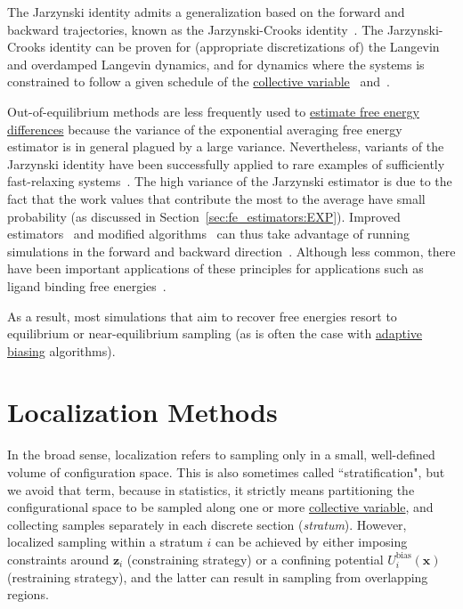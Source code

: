 \documentclass[9pt,review]{livecoms}
\newcommand{\vx}{\mathbf{x}}
\newcommand{\vz}{\mathbf{z}}
\begin{document}
The Jarzynski identity admits a generalization based on the forward and backward trajectories, known as the Jarzynski-Crooks identity~\cite{Crooks99}. The Jarzynski-Crooks identity can be proven for (appropriate discretizations of) the Langevin and overdamped Langevin dynamics, and for dynamics where the systems is constrained to follow a given schedule of the \hyperlink{ref:CV} {collective variable}~\cite{lelievre-rousset-stoltz-07-a,lelievre-rousset-stoltz-12} and~\cite[Chapter 4]{Lelievre2010}.

Out-of-equilibrium methods are less frequently used to \hyperlink{ref:FEestimator} {estimate free energy differences} because the variance of the exponential averaging free energy estimator is in general plagued by a large variance.
Nevertheless, variants of the Jarzynski identity have been successfully applied to rare examples of sufficiently fast-relaxing systems~\cite{park-khalili-araghi-tajkhorshid-schulten-03}.
The high variance of the Jarzynski estimator is due to the fact that the work values that contribute the most to the average have small probability (as discussed in Section~\ref{sec:fe_estimators:EXP}).
Improved estimators~\cite{minh-adlib-08} and modified algorithms~\cite{VJ08,hartmann-schuette-zhang-19,rousset2006equilibrium} can thus take advantage of running simulations in the forward and backward direction~\cite{hummer-07}. Although less common, there have been important applications of these principles for applications such as ligand binding free energies~\citep{alchemy_Gapsys_2020}.


As a result, most simulations that aim to recover free energies resort to equilibrium or near-equilibrium sampling (as is often the case with \hyperlink{ref:Adaptive} {adaptive} \hyperlink{ref:biasingE} {biasing} algorithms).


\section{Localization Methods}
\label{sec:localization}

In the broad sense, localization refers to sampling only in a small, well-defined volume of configuration space.  This is also sometimes called ``stratification", but we avoid that term, because in statistics, it strictly means partitioning the configurational space to be sampled along one or more \hyperlink{ref:CV} {collective variable}, and collecting samples separately in each discrete section (\textit{stratum}). However, localized sampling within a stratum $i$ can be achieved by either imposing constraints around $\vz_i$ (constraining strategy) or a confining potential $U^{\mathrm{bias}}_i(\vx)$ (restraining strategy), and the latter can result in sampling from overlapping regions.
\end{document}
